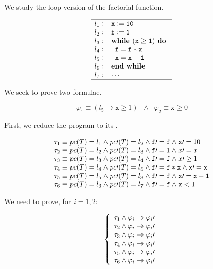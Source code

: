 


We study the loop version of the factorial function.


\[
	\begin{array}{l@{\hspace{0.3em}}c@{\hspace{1em}}l}
	\hline
		l_1 & : & \mathtt{x := 10} \\
		l_2 & : & \mathtt{f := 1} \\
		l_3 & : & \mathtt{\textbf{while } (x\geq 1) \textbf{ do }} \\
		l_4 & : & \mathtt{\;\;f = f*x} \\
		l_5 & : & \mathtt{\;\;x=x-1} \\ 	
		l_6 & : & \mathtt{\textbf{end while}}\\
		l_7 & : & \mathtt{\cdots}\\
	\hline
	\end{array}
\]
\label{simple:example}




We seek to prove two formulae.

\[\varphi_1 \equiv (l_5 \to \mathtt{x}\geq 1) \;\; \wedge \;\; \varphi_2 \equiv \mathtt{x} \geq 0\]

First, we reduce the program to its \VC.


\[
	\begin{array}{l}
		 \tau_1 \equiv pc(T) = l_1 \wedge pc\prime (T) = l_2 \wedge \mathtt{f\prime =f} \wedge \mathtt{x}\prime  = 10\\
		 \tau_2 \equiv pc(T) = l_2 \wedge pc\prime (T) = l_3 \wedge \mathtt{f}\prime  = 1 \wedge x\prime =x\\
		 \tau_3 \equiv pc(T) = l_3 \wedge pc\prime (T) = l_4 \wedge \mathtt{f\prime =f} \wedge x\prime \geq 1\\
		 \tau_4 \equiv pc(T) = l_4 \wedge pc\prime (T) = l_5 \wedge \mathtt{f}\prime  = \mathtt{f*x} \wedge \mathtt{x\prime =x}\\
		 \tau_5 \equiv pc(T) = l_5 \wedge pc\prime (T) = l_3 \wedge \mathtt{f\prime =f} \wedge \mathtt{x\prime =x-1}\\
		 \tau_6 \equiv pc(T) = l_3 \wedge pc\prime (T) = l_7 \wedge \mathtt{f\prime =f} \wedge \mathtt{x<1}
	\end{array}
\]

We need to prove, for $i=1,2$:

\[
	\left\{
		\begin{array}{l}
			\tau_1 \wedge \varphi_i \to \varphi_i\prime  \\
			\tau_2 \wedge \varphi_i \to \varphi_i\prime \\
			\tau_3 \wedge \varphi_i \to \varphi_i\prime  \\
			\tau_4 \wedge \varphi_i \to \varphi_i\prime \\
			\tau_5 \wedge \varphi_i \to \varphi_i\prime  \\
			\tau_6 \wedge \varphi_i \to \varphi_i\prime 
		\end{array}
	\right.
\]

